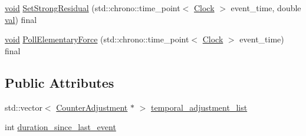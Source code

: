 \begin{DoxyCompactItemize}
\item 
\mbox{\hyperlink{glad_8h_a950fc91edb4504f62f1c577bf4727c29}{void}} \mbox{\hyperlink{class_dimension_a9bd5480b1da689cd58bf61dac7169080}{Set\+Strong\+Residual}} (std\+::chrono\+::time\+\_\+point$<$ \mbox{\hyperlink{universe_8h_a0ef8d951d1ca5ab3cfaf7ab4c7a6fd80}{Clock}} $>$ event\+\_\+time, double \mbox{\hyperlink{glad_8h_a26942fd2ed566ef553eae82d2c109c8f}{val}}) final
\item 
\mbox{\hyperlink{glad_8h_a950fc91edb4504f62f1c577bf4727c29}{void}} \mbox{\hyperlink{class_dimension_a5b07f5c8558233c8f3488baf1fe3459a}{Poll\+Elementary\+Force}} (std\+::chrono\+::time\+\_\+point$<$ \mbox{\hyperlink{universe_8h_a0ef8d951d1ca5ab3cfaf7ab4c7a6fd80}{Clock}} $>$ event\+\_\+time) final
\end{DoxyCompactItemize}
\subsection*{Public Attributes}
\begin{DoxyCompactItemize}
\item 
std\+::vector$<$ \mbox{\hyperlink{struct_dimension_1_1_counter_adjustment}{Counter\+Adjustment}} $\ast$ $>$ \mbox{\hyperlink{class_dimension_a370bb42cca1211c7a6c66846ecec4dd9}{temporal\+\_\+adjustment\+\_\+list}}
\item 
int \mbox{\hyperlink{class_dimension_a8095020214e474081002dbf7d9ff9d42}{duration\+\_\+since\+\_\+last\+\_\+event}}
\end{DoxyCompactItemize}
